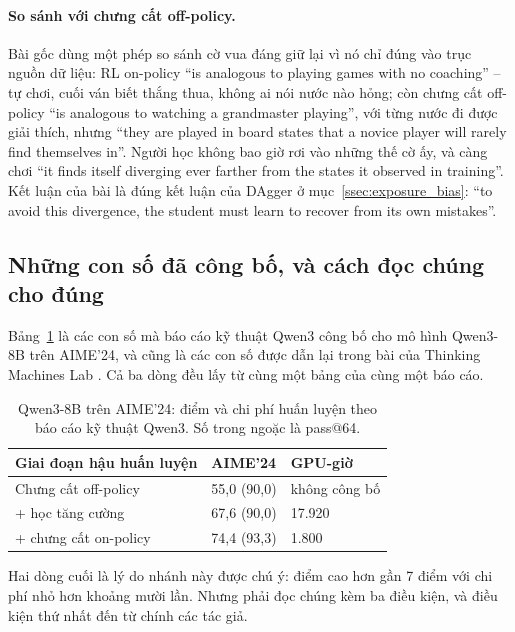 \paragraph{So sánh với chưng cất off-policy.} Bài gốc dùng một phép so sánh cờ vua đáng giữ lại vì nó chỉ đúng vào trục nguồn dữ liệu: RL on-policy ``is analogous to playing games with no coaching'' -- tự chơi, cuối ván biết thắng thua, không ai nói nước nào hỏng; còn chưng cất off-policy ``is analogous to watching a grandmaster playing'', với từng nước đi được giải thích, nhưng ``they are played in board states that a novice player will rarely find themselves in''. Người học không bao giờ rơi vào những thế cờ ấy, và càng chơi ``it finds itself diverging ever farther from the states it observed in training''. Kết luận của bài là đúng kết luận của DAgger ở mục~\ref{ssec:exposure_bias}: ``to avoid this divergence, the student must learn to recover from its own mistakes''.

\subsection{Những con số đã công bố, và cách đọc chúng cho đúng}
\label{ssec:opd_numbers}

Bảng~\ref{tab:opd_qwen3_cost} là các con số mà báo cáo kỹ thuật Qwen3 \cite{yang2025qwen3} công bố cho mô hình Qwen3-8B trên AIME'24, và cũng là các con số được dẫn lại trong bài của Thinking Machines Lab \cite{lu2025opd}. Cả ba dòng đều lấy từ cùng một bảng của cùng một báo cáo.

\begin{table}[H]
\centering\small
\caption{Qwen3-8B trên AIME'24: điểm và chi phí huấn luyện theo báo cáo kỹ thuật Qwen3. Số trong ngoặc là pass@64.}
\label{tab:opd_qwen3_cost}
\begin{tabularx}{\textwidth}{@{}Xll@{}}
\toprule
\textbf{Giai đoạn hậu huấn luyện} & \textbf{AIME'24} & \textbf{GPU-giờ} \\
\midrule
Chưng cất off-policy & 55,0 (90,0) & không công bố \\
\quad + học tăng cường & 67,6 (90,0) & 17.920 \\
\quad + chưng cất on-policy & 74,4 (93,3) & 1.800 \\
\bottomrule
\end{tabularx}
\end{table}

Hai dòng cuối là lý do nhánh này được chú ý: điểm cao hơn gần 7 điểm với chi phí nhỏ hơn khoảng mười lần. Nhưng phải đọc chúng kèm ba điều kiện, và điều kiện thứ nhất đến từ chính các tác giả.

